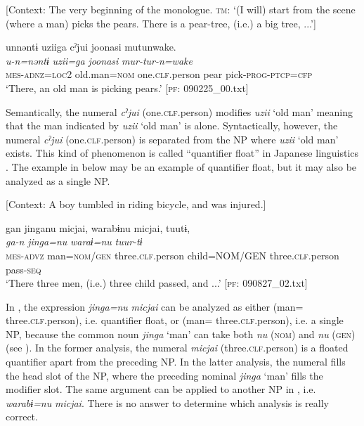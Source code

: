 [Context: The very beginning of the monologue. \textsc{tm}: ‘(I will) start from the scene (where a man) picks the pears. There is a pear-tree, (i.e.) a big tree, ...’]

{\TM}
\glll unnəntɨ  uziiga  cˀjui  joonasi   mutunwake.\\
\textit{u-n=nəntɨ}  \textit{uzii=ga}  \textit{}  \textit{joonasi} \textit{mur-tur-n=wake}\\
    \textsc{mes}-\textsc{adnz}=\textsc{loc}2  old.man=\textsc{nom}  one.\textsc{clf}.person  pear  pick-\textsc{prog}-\textsc{ptcp}=\textsc{cfp}\\
\glt    ‘There, an old man is picking pears.’ [\textsc{pf}: 090225\_00.txt]

\z

Semantically, the numeral \textit{cˀjui} (one.\textsc{clf}.person) modifies \textit{uzii} ‘old man’ meaning that the man indicated by \textit{uzii} ‘old man’ is alone. Syntactically, however, the numeral \textit{cˀjui} (one.\textsc{clf}.person) is separated from the NP where \textit{uzii} ‘old man’ exists. This kind of phenomenon is called “quantifier float” in Japanese linguistics \citep[286]{Shibatani1990}. The example in  below may be an example of quantifier float, but it may also be analyzed as a single NP.

\ea \label{ex:7:17}  [Context: A boy tumbled in riding bicycle, and was injured.]

{\TM}
\glll gan  jinganu  micjai,  warabɨnu  micjai,  tuutɨ,\\
\textit{ga-n}  \textit{jinga=nu}  \textit{}  \textit{waraɨ=nu} \textit{}  \textit{tuur-tɨ}\\
    \textsc{mes}-\textsc{advz}  man=\textsc{nom}/\textsc{gen}  three.\textsc{clf}.person  child=NOM/GEN   three.\textsc{clf}.person  pass-\textsc{seq}\\
\glt    ‘There three men, (i.e.) three child passed, and ...’ [\textsc{pf}: 090827\_02.txt]

\z

In , the expression \textit{jinga=nu} \textit{micjai} can be analyzed as either (man= three.\textsc{clf}.person), i.e. quantifier float, or (man= three.\textsc{clf}.person), i.e. a single NP, because the common noun \textit{jinga} ‘man’ can take both \textit{nu} (\textsc{nom}) and \textit{nu} (\textsc{gen}) (see ). In the former analysis, the numeral \textit{micjai} (three.\textsc{clf}.person) is a floated quantifier apart from the preceding NP. In the latter analysis, the numeral fills the head slot of the NP, where the preceding nominal \textit{jinga} ‘man’ fills the modifier slot. The same argument can be applied to another NP in , i.e. \textit{warabɨ=nu} \textit{micjai}. There is no answer to determine which analysis is really correct.

